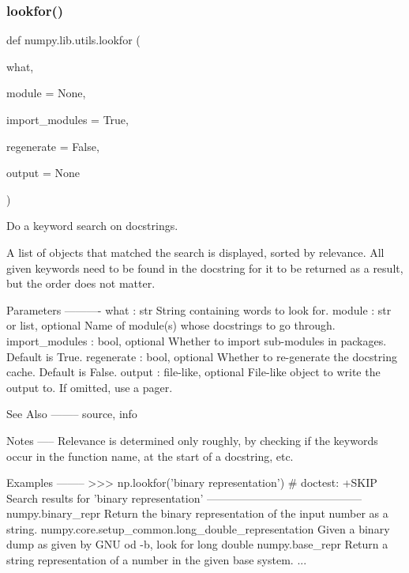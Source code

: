 \subsubsection{\texorpdfstring{lookfor()}{lookfor()}}
{\footnotesize\ttfamily def numpy.\+lib.\+utils.\+lookfor (\begin{DoxyParamCaption}\item[{}]{what,  }\item[{}]{module = {\ttfamily None},  }\item[{}]{import\+\_\+modules = {\ttfamily True},  }\item[{}]{regenerate = {\ttfamily False},  }\item[{}]{output = {\ttfamily None} }\end{DoxyParamCaption})}

\begin{DoxyVerb}Do a keyword search on docstrings.

A list of objects that matched the search is displayed,
sorted by relevance. All given keywords need to be found in the
docstring for it to be returned as a result, but the order does
not matter.

Parameters
----------
what : str
    String containing words to look for.
module : str or list, optional
    Name of module(s) whose docstrings to go through.
import_modules : bool, optional
    Whether to import sub-modules in packages. Default is True.
regenerate : bool, optional
    Whether to re-generate the docstring cache. Default is False.
output : file-like, optional
    File-like object to write the output to. If omitted, use a pager.

See Also
--------
source, info

Notes
-----
Relevance is determined only roughly, by checking if the keywords occur
in the function name, at the start of a docstring, etc.

Examples
--------
>>> np.lookfor('binary representation') # doctest: +SKIP
Search results for 'binary representation'
------------------------------------------
numpy.binary_repr
    Return the binary representation of the input number as a string.
numpy.core.setup_common.long_double_representation
    Given a binary dump as given by GNU od -b, look for long double
numpy.base_repr
    Return a string representation of a number in the given base system.
...\end{DoxyVerb}
 \mbox{\label{namespacenumpy_1_1lib_1_1utils_a5439fed5d1eee86e9616441b8bdda46e}} 
